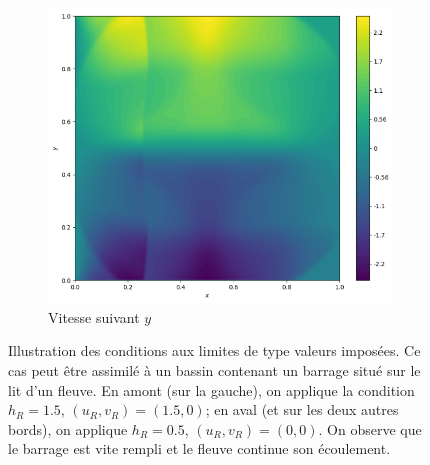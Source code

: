 \documentclass[
	french,
	11pt, %
]{fphw}
\begin{document}
\begin{figure}[H]
\begin{subfigure}{0.32\textwidth}
		\label{fig:Bord2u}
	\end{subfigure}
	\begin{subfigure}{0.32\textwidth}
		\centering
		\includegraphics[width=\textwidth,height=0.85\textwidth]{Bord2v.png}
		\caption{Vitesse suivant $y$}
		\label{fig:Bord2v}
	\end{subfigure}
	\caption{Illustration des conditions aux limites de type valeurs imposées. Ce cas peut être assimilé à un bassin contenant un barrage situé sur le lit d'un fleuve. En amont (sur la gauche), on applique la condition $h_R=1.5$, $(u_R,v_R)=(1.5,0)$; en aval (et sur les deux autres bords), on applique $h_R=0.5$, $(u_R,v_R)=(0,0)$. On observe que le barrage est vite rempli et le fleuve continue son écoulement.}
	\label{fig:Bord2}
\end{figure}
\end{document}
